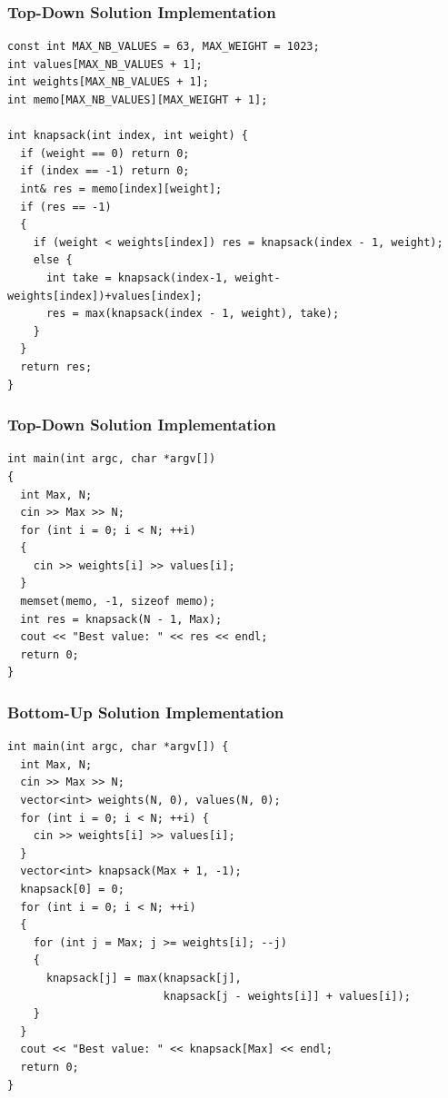 \documentclass{beamer}
\begin{document}
\begin{frame}[containsverbatim]
\frametitle{Top-Down Solution Implementation}

\scriptsize
\begin{lstlisting}
const int MAX_NB_VALUES = 63, MAX_WEIGHT = 1023;
int values[MAX_NB_VALUES + 1];
int weights[MAX_NB_VALUES + 1];
int memo[MAX_NB_VALUES][MAX_WEIGHT + 1];

int knapsack(int index, int weight) {
  if (weight == 0) return 0;
  if (index == -1) return 0;
  int& res = memo[index][weight];
  if (res == -1)
  {
    if (weight < weights[index]) res = knapsack(index - 1, weight);
    else {
      int take = knapsack(index-1, weight-weights[index])+values[index];
      res = max(knapsack(index - 1, weight), take);
    }
  }
  return res;
}
\end{lstlisting}

\end{frame}

\begin{frame}[containsverbatim]
\frametitle{Top-Down Solution Implementation}

\scriptsize
\begin{lstlisting}
int main(int argc, char *argv[])
{
  int Max, N;
  cin >> Max >> N;
  for (int i = 0; i < N; ++i)
  {
    cin >> weights[i] >> values[i];
  }
  memset(memo, -1, sizeof memo);
  int res = knapsack(N - 1, Max);
  cout << "Best value: " << res << endl;
  return 0;
}
\end{lstlisting}

\end{frame}

\begin{frame}[containsverbatim]
\frametitle{Bottom-Up Solution Implementation}

\scriptsize
\begin{lstlisting}
int main(int argc, char *argv[]) {
  int Max, N;
  cin >> Max >> N;
  vector<int> weights(N, 0), values(N, 0);
  for (int i = 0; i < N; ++i) {
    cin >> weights[i] >> values[i];
  }
  vector<int> knapsack(Max + 1, -1);
  knapsack[0] = 0;
  for (int i = 0; i < N; ++i)
  {
    for (int j = Max; j >= weights[i]; --j)
    {
      knapsack[j] = max(knapsack[j],
                        knapsack[j - weights[i]] + values[i]);
    }
  }
  cout << "Best value: " << knapsack[Max] << endl;
  return 0;
}
\end{lstlisting}

\end{frame}
\end{document}
